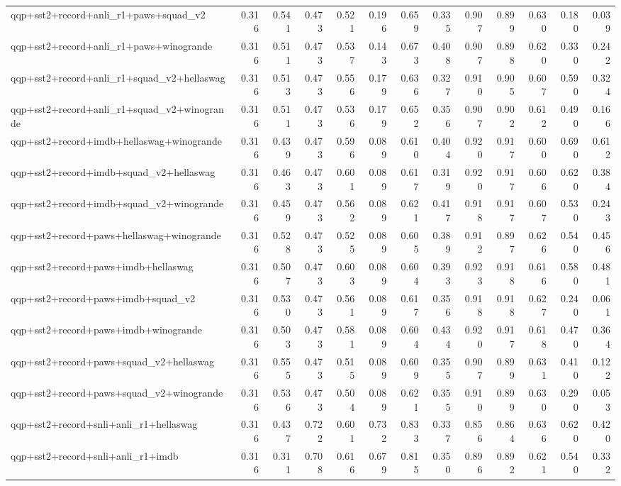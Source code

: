 \begin{table}[t]
\begin{tabular}{lrrrrrrrrrrrr}
    qqp+sst2+record+anli\_r1+paws+squad\_v2 & 0.316 & 0.541 & 0.473 & 0.521 & 0.196 & 0.659 & 0.335 & 0.907 & 0.899 & 0.630 & 0.180 & 0.039 \\
    qqp+sst2+record+anli\_r1+paws+winogrande & 0.316 & 0.511 & 0.473 & 0.537 & 0.143 & 0.673 & 0.408 & 0.907 & 0.898 & 0.620 & 0.330 & 0.242 \\
    qqp+sst2+record+anli\_r1+squad\_v2+hellaswag & 0.316 & 0.513 & 0.473 & 0.556 & 0.179 & 0.636 & 0.327 & 0.910 & 0.905 & 0.607 & 0.590 & 0.324 \\
    qqp+sst2+record+anli\_r1+squad\_v2+winogrande & 0.316 & 0.511 & 0.473 & 0.536 & 0.179 & 0.652 & 0.356 & 0.907 & 0.902 & 0.612 & 0.490 & 0.166 \\
    qqp+sst2+record+imdb+hellaswag+winogrande & 0.316 & 0.439 & 0.473 & 0.596 & 0.089 & 0.610 & 0.404 & 0.920 & 0.917 & 0.600 & 0.690 & 0.612 \\
    qqp+sst2+record+imdb+squad\_v2+hellaswag & 0.316 & 0.463 & 0.473 & 0.601 & 0.089 & 0.617 & 0.319 & 0.920 & 0.917 & 0.606 & 0.620 & 0.384 \\
    qqp+sst2+record+imdb+squad\_v2+winogrande & 0.316 & 0.459 & 0.473 & 0.562 & 0.089 & 0.621 & 0.417 & 0.918 & 0.917 & 0.607 & 0.530 & 0.243 \\
    qqp+sst2+record+paws+hellaswag+winogrande & 0.316 & 0.528 & 0.473 & 0.525 & 0.089 & 0.605 & 0.389 & 0.912 & 0.897 & 0.626 & 0.540 & 0.456 \\
    qqp+sst2+record+paws+imdb+hellaswag & 0.316 & 0.507 & 0.473 & 0.603 & 0.089 & 0.604 & 0.393 & 0.923 & 0.918 & 0.616 & 0.580 & 0.481 \\
    qqp+sst2+record+paws+imdb+squad\_v2 & 0.316 & 0.530 & 0.473 & 0.561 & 0.089 & 0.617 & 0.356 & 0.918 & 0.918 & 0.627 & 0.240 & 0.061 \\
    qqp+sst2+record+paws+imdb+winogrande & 0.316 & 0.503 & 0.473 & 0.581 & 0.089 & 0.604 & 0.434 & 0.920 & 0.917 & 0.618 & 0.470 & 0.364 \\
    qqp+sst2+record+paws+squad\_v2+hellaswag & 0.316 & 0.555 & 0.473 & 0.515 & 0.089 & 0.609 & 0.355 & 0.907 & 0.899 & 0.631 & 0.410 & 0.122 \\
    qqp+sst2+record+paws+squad\_v2+winogrande & 0.316 & 0.536 & 0.473 & 0.504 & 0.089 & 0.621 & 0.355 & 0.910 & 0.899 & 0.630 & 0.290 & 0.053 \\
    qqp+sst2+record+snli+anli\_r1+hellaswag & 0.316 & 0.437 & 0.722 & 0.601 & 0.732 & 0.833 & 0.337 & 0.856 & 0.864 & 0.636 & 0.620 & 0.420 \\
    qqp+sst2+record+snli+anli\_r1+imdb & 0.316 & 0.311 & 0.708 & 0.616 & 0.679 & 0.815 & 0.350 & 0.896 & 0.892 & 0.621 & 0.540 & 0.332 \\

\end{tabular}
\end{table}
